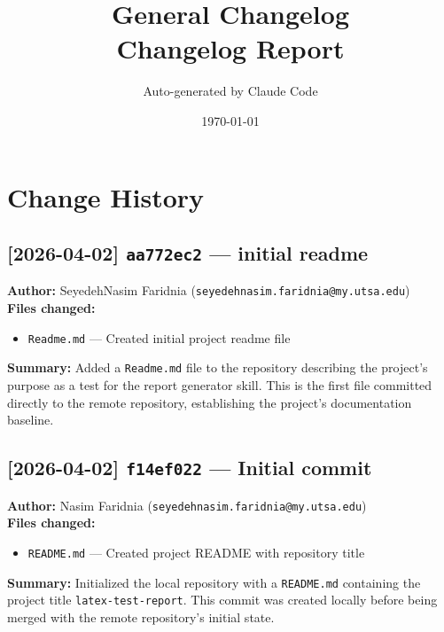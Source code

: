 \documentclass[12pt,a4paper]{article}
\title{General Changelog\\[0.5em]\large Changelog Report}
\author{Auto-generated by Claude Code}
\date{\today}
\begin{document}
\maketitle
\tableofcontents
\newpage

\section{Change History}


\subsection*{[2026-04-02] \texttt{aa772ec2} --- initial readme}

\textbf{Author:} SeyedehNasim Faridnia (\texttt{seyedehnasim.faridnia@my.utsa.edu}) \\[0.3em]
\textbf{Files changed:}
\begin{itemize}
  \item \texttt{Readme.md} --- Created initial project readme file
\end{itemize}

\vspace{0.3em}
\textbf{Summary:} Added a \texttt{Readme.md} file to the repository describing the project's
purpose as a test for the report generator skill. This is the first file committed directly
to the remote repository, establishing the project's documentation baseline.

\subsection*{[2026-04-02] \texttt{f14ef022} --- Initial commit}

\textbf{Author:} Nasim Faridnia (\texttt{seyedehnasim.faridnia@my.utsa.edu}) \\[0.3em]
\textbf{Files changed:}
\begin{itemize}
  \item \texttt{README.md} --- Created project README with repository title
\end{itemize}

\vspace{0.3em}
\textbf{Summary:} Initialized the local repository with a \texttt{README.md} containing the
project title \texttt{latex-test-report}. This commit was created locally before being
merged with the remote repository's initial state.
\end{document}
